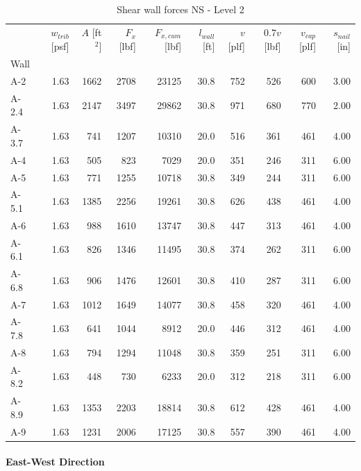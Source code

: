 \documentclass[11pt]{article}
\begin{document}
    
    \begin{table}[H]
\centering
\caption{Shear wall forces NS - Level 2}
\label{tab:shear_wall_forces_level2_ns}
\begin{tabular}{lrrrrrrrrr}
\toprule
 & $w_{trib}$ [psf] & $A$ [ft$^2$] & $F_x$ [lbf] & $F_{x,cum}$ [lbf] & $l_{wall}$ [ft] & $v$ [plf] & $0.7 v$ [lbf] & $v_{cap}$ [plf] & $s_{nail}$ [in] \\
Wall &  &  &  &  &  &  &  &  &  \\
\midrule
A-2 & 1.63 & 1662 & 2708 & 23125 & 30.8 & 752 & 526 & 600 & 3.00 \\
A-2.4 & 1.63 & 2147 & 3497 & 29862 & 30.8 & 971 & 680 & 770 & 2.00 \\
A-3.7 & 1.63 & 741 & 1207 & 10310 & 20.0 & 516 & 361 & 461 & 4.00 \\
A-4 & 1.63 & 505 & 823 & 7029 & 20.0 & 351 & 246 & 311 & 6.00 \\
A-5 & 1.63 & 771 & 1255 & 10718 & 30.8 & 349 & 244 & 311 & 6.00 \\
A-5.1 & 1.63 & 1385 & 2256 & 19261 & 30.8 & 626 & 438 & 461 & 4.00 \\
A-6 & 1.63 & 988 & 1610 & 13747 & 30.8 & 447 & 313 & 461 & 4.00 \\
A-6.1 & 1.63 & 826 & 1346 & 11495 & 30.8 & 374 & 262 & 311 & 6.00 \\
A-6.8 & 1.63 & 906 & 1476 & 12601 & 30.8 & 410 & 287 & 311 & 6.00 \\
A-7 & 1.63 & 1012 & 1649 & 14077 & 30.8 & 458 & 320 & 461 & 4.00 \\
A-7.8 & 1.63 & 641 & 1044 & 8912 & 20.0 & 446 & 312 & 461 & 4.00 \\
A-8 & 1.63 & 794 & 1294 & 11048 & 30.8 & 359 & 251 & 311 & 6.00 \\
A-8.2 & 1.63 & 448 & 730 & 6233 & 20.0 & 312 & 218 & 311 & 6.00 \\
A-8.9 & 1.63 & 1353 & 2203 & 18814 & 30.8 & 612 & 428 & 461 & 4.00 \\
A-9 & 1.63 & 1231 & 2006 & 17125 & 30.8 & 557 & 390 & 461 & 4.00 \\
\bottomrule
\end{tabular}
\end{table}


    
    \paragraph{East-West Direction}\label{east-west-direction}
\end{document}
